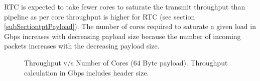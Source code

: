 RTC is expected to take fewer cores to saturate the transmit throughput than pipeline as per core throughput is higher for RTC (see section \ref{subSectiontptPayload}).
The number of cores required to saturate a given load in Gbps increases with decreasing payload size because the number of incoming packets increases with the decreasing payload size.
\begin{figure}[htbp]
    \centering
    \caption{ Throughput v/s Number of Cores (64 Byte payload). Throughput calculation in Gbps includes header size.}
        \label{figure64Scaling}
    \end{figure}

